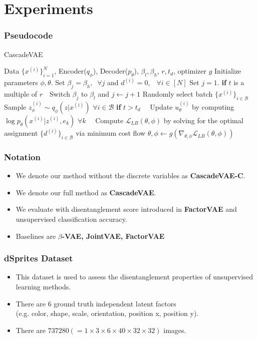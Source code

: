 \documentclass[10pt,mathserif]{beamer}
\newcommand{\algorithmicinput}{\textbf{input}}
\newcommand{\INPUT}{\item[\algorithmicinput]}
\begin{document}
\section{Experiments}
\begin{frame}
\frametitle{Pseudocode}
\begin{algorithm}[H]
\caption{CascadeVAE}
\footnotesize
\begin{algorithmic}[1]
\INPUT Data $\{x^{(i)}\}_{i=1}^N$, Encoder($q_\phi$), Decoder($p_\theta$), $\beta_l, \beta_h$, $r, t_d$, optimizer $g$
\STATE Initialize parameters $\phi, \theta$.
\STATE Set $\beta_j=\beta_h,~$ $\forall j$ and $d^{(i)}=0,$ $~~\forall i\in [N]$
\STATE Set $j=1$.
\STATE \textbf{if} $t$ is a multiple of $r$
\STATE $~~~$Switch $\beta_j$ to $\beta_l$ and $j\leftarrow j+1$
\STATE Randomly select batch $\{x^{(i)}\}_{i \in \mathcal{B}}$
\STATE Sample $z^{(i)}_\phi \sim q_{\phi}(z|x^{(i)})$ $\forall i \in \mathcal{B}$ 
\STATE \textbf{if} $t>t_d$
\STATE $~~~$ Update $u_\theta^{(i)}$ by computing $\log p_\theta(x^{(i)}|z^{(i)}, e_k)$ $\forall k$
\STATE $~~~$ Compute $\mathcal{L}_{LB}(\theta, \phi)$ by solving for the optimal \\
\qquad assignment $\{d^{(i)}\}_{i\in \mathcal{B}}$ via minimum cost flow 
\STATE $\theta, \phi \leftarrow g\left(\nabla_{\theta,\phi} \mathcal{L}_{LB}(\theta,\phi)\right)$
\ENDFOR
\end{algorithmic}
\end{algorithm}
\end{frame}


\begin{frame}
\frametitle{Notation}
\begin{itemize}\itemsep=12pt
\item We denote our method without the discrete variables as \textbf{CascadeVAE-C}.
\item We denote our full method as \textbf{CascadeVAE}. 
\item We evaluate with disentanglement score introduced in \textbf{FactorVAE} and unsupervised classification accuracy.
\item Baselines are \textbf{$\beta$-VAE, JointVAE, FactorVAE}
\end{itemize}
\end{frame}

\begin{frame}
\frametitle{dSprites Dataset}
\begin{itemize}\itemsep=20pt
\item This dataset is used to assess the disentanglement properties of unsupervised learning methods.\pause
\item There are 6 ground truth independent latent factors\\
    (e.g. color, shape, scale, orientation, position x, position y).\pause
\item There are $737280(=1\times3\times6\times40\times32\times32)$ images.
\end{itemize}
\end{frame}
\end{document}
